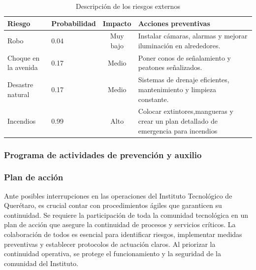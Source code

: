      \begin{table}[H]
         \centering
    \caption{Descripción de los riesgos externos}
    
        \begin{tabular}{|p{4em}|p{6em}|c|p{6em}|}
             \hline
             \textbf{Riesgo}& \textbf{Probabilidad}& \textbf{Impacto}& \textbf{Acciones preventivas}\\
             \hline
             Robo & 0.04& Muy bajo& Instalar cámaras, alarmas y mejorar iluminación en alrededores.\\
             \hline
              Choque en la avenida& 0.17 & Medio&Poner conos de señalamiento y peatones señalizados.\\
              \hline
              Desastre natural& 0.17& Medio& Sistemas de drenaje eficientes, mantenimiento y limpieza constante.\\
              \hline
             Incendios& 0.99& Alto& Colocar extintores,mangueras y crear un plan detallado de emergencia para incendios\\         
              \hline
    
         \end{tabular}
         \label{tab:RiesgosExternos}
    \end{table}
    \subsubsection{Programa de actividades de prevención y auxilio}
    
    \subsubsection{Plan de acción}
    Ante posibles interrupciones en las operaciones del Instituto Tecnológico de Querétaro, es crucial contar con procedimientos ágiles que garanticen su continuidad. Se requiere la participación de toda la comunidad tecnológica en un plan de acción que asegure la continuidad de procesos y servicios críticos. La colaboración de todos es esencial para identificar riesgos, implementar medidas preventivas y establecer protocolos de actuación claros. Al priorizar la continuidad operativa, se protege el funcionamiento y la seguridad de la comunidad del Instituto.
    
